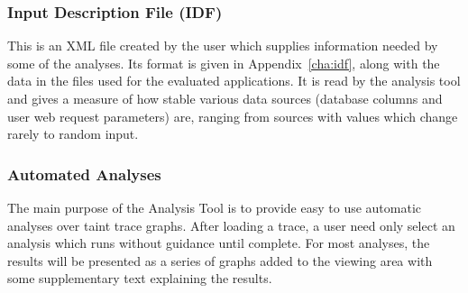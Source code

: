 \documentclass[msc,oneside]{ubcthesis}
\begin{document}




\subsubsection{Input Description File (IDF)}
\label{sec:idf}
This is an XML file created by the user which supplies information needed by some of the analyses. Its format is given in Appendix~\ref{cha:idf}, along with the data in the files used for the evaluated applications. It is read by the analysis tool and gives a measure of how stable various data sources (database columns and user web request parameters) are, ranging from sources with values which change rarely to random input.

\subsubsection{Automated Analyses}
The main purpose of the Analysis Tool is to provide easy to use automatic analyses over taint trace graphs. After loading a trace, a user need only select an analysis which runs without guidance until complete. For most analyses, the results will be presented as a series of graphs added to the viewing area with some supplementary text explaining the results.
\end{document}

